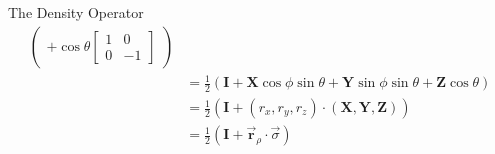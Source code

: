 \documentclass{beamer}
\begin{document}
\begin{frame}{The Density Operator\tiny\cite{rotationsonblochsphere}}
{\begin{align*}
\begin{pmatrix}
                +
                \cos\theta
                \begin{bmatrix}
                  1 & 0 \\
                  0 & -1
                \end{bmatrix}
              \end{pmatrix} \\
            &= \frac{1}2(\mathbf{I} + \mathbf{X}\cos\phi\sin\theta + \mathbf{Y}\sin\phi\sin\theta + \mathbf{Z}\cos\theta) \\
            &= \frac{1}2(\mathbf{I} + (r_x, r_y, r_z) \cdot (\mathbf{X}, \mathbf{Y}, \mathbf{Z}) ) \\
            &= \frac{1}2 ( \mathbf{I} + \overrightarrow{\mathbf{r}}_{\rho} \cdot \overrightarrow{\sigma} )
    \end{align*}
  }%
\end{frame}
\end{document}
